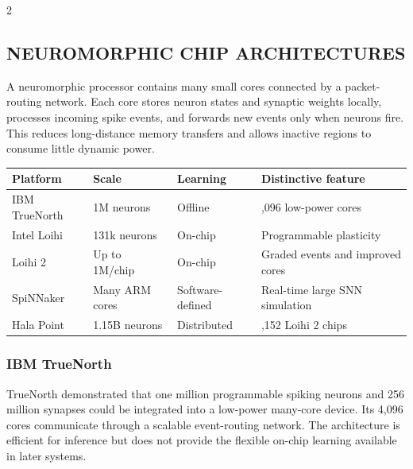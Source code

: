 \begin{multicols}{2}
  \subsection*{\centering\uppercase{Neuromorphic Chip Architectures}}
  A neuromorphic processor contains many small cores connected by a packet-routing network. Each core stores neuron states and synaptic weights locally, processes incoming spike events, and forwards new events only when neurons fire. This reduces long-distance memory transfers and allows inactive regions to consume little dynamic power.

  \begin{center}
\begin{minipage}{0.98\columnwidth}
\centering
    \scriptsize
    \setlength{\tabcolsep}{2.5pt}
    \renewcommand{\arraystretch}{1.2}
    \begin{tabular}{@{}>{\RaggedRight\arraybackslash}p{}
      >{\RaggedRight\arraybackslash}p{}
      >{\RaggedRight\arraybackslash}p{}
      >{\RaggedRight\arraybackslash}p{}@{}}
      \toprule
      \textbf{Platform} & \textbf{Scale} & \textbf{Learning} & \textbf{Distinctive feature} \\
      \midrule
      IBM TrueNorth & 1M neurons & Offline & 4,096 low-power cores \\
      Intel Loihi & 131k neurons & On-chip & Programmable plasticity \\
      Loihi 2 & Up to 1M/chip & On-chip & Graded events and improved cores \\
      SpiNNaker & Many ARM cores & Software-defined & Real-time large SNN simulation \\
      Hala Point & 1.15B neurons & Distributed & 1,152 Loihi 2 chips \\
      \bottomrule
    \end{tabular}
\end{minipage}
  \end{center}

  \subsubsection*{IBM TrueNorth}
  TrueNorth demonstrated that one million programmable spiking neurons and 256 million synapses could be integrated into a low-power many-core device. Its 4,096 cores communicate through a scalable event-routing network. The architecture is efficient for inference but does not provide the flexible on-chip learning available in later systems.


\end{multicols}
